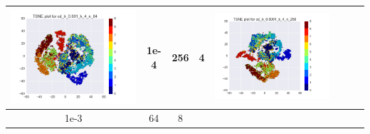 \documentclass[12pt]{report}
\begin{document}
\begin{table}[H]
\begin{tabular}{ | c | c | c | c || c | c | c| c |}
\begin{minipage}{.3\textwidth}
      \includegraphics[scale=0.25]{cd_lr_0_001_k_4_n_64.png}
    \end{minipage}
	&
    1e-4 & 256 & 4 &
    \begin{minipage}{.3\textwidth}
      \includegraphics[scale=0.25]{cd_lr_0_0001_k_4_n_256.png}
    \end{minipage}
    \\ \hline
    1e-3 & 64 & 8 &
    \begin{minipage}{.3\textwidth}

\end{minipage}
\end{tabular}
\end{table}
\end{document}
